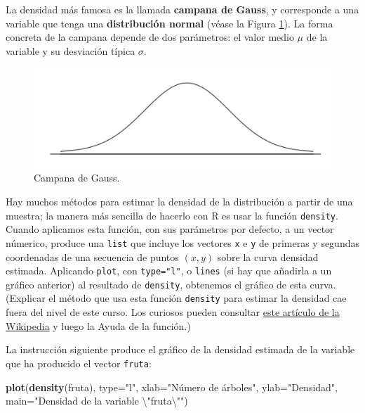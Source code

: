 \documentclass[]{book}
\newenvironment{Shaded}{\begin{snugshade}}{\end{snugshade}}
\newcommand{\CharTok}[1]{\textcolor[rgb]{0.31,0.60,0.02}{#1}}
\newcommand{\DataTypeTok}[1]{\textcolor[rgb]{0.13,0.29,0.53}{#1}}
\newcommand{\KeywordTok}[1]{\textcolor[rgb]{0.13,0.29,0.53}{\textbf{#1}}}
\newcommand{\NormalTok}[1]{#1}
\newcommand{\StringTok}[1]{\textcolor[rgb]{0.31,0.60,0.02}{#1}}
\theoremstyle{definition}
\theoremstyle{definition}
\theoremstyle{definition}
\theoremstyle{remark}
\begin{document}
La densidad más famosa es la llamada \textbf{campana de Gauss}, y corresponde a una variable que tenga una \textbf{distribución normal} (véase la Figura \ref{fig:norm}). La forma concreta de la campana depende de dos parámetros: el valor medio \(\mu\) de la variable y su desviación típica \(\sigma\).

\begin{figure}

{\centering \includegraphics[width=1\linewidth]{AprendeR-Parte-I_files/figure-html/gauss} 

}

\caption{Campana de Gauss.}\label{fig:norm}
\end{figure}

Hay muchos métodos para estimar la densidad de la distribución a partir de una muestra; la manera más sencilla de hacerlo con R es usar la función \texttt{density}. Cuando aplicamos esta función, con sus parámetros por defecto, a un vector númerico, produce una \texttt{list} que incluye los vectores \texttt{x} e \texttt{y} de primeras y segundas coordenadas de una secuencia de puntos \((x,y)\) sobre la curva densidad estimada. Aplicando \texttt{plot}, con \texttt{type="l"}, o \texttt{lines} (si hay que añadirla a un gráfico anterior) al resultado de \texttt{density}, obtenemos el gráfico de esta curva. (Explicar el método que usa esta función \texttt{density} para estimar la densidad cae fuera del nivel de este curso. Los curiosos pueden consultar \href{http://en.wikipedia.org/wiki/Kernel_density_estimation}{este artículo de la Wikipedia} y luego la Ayuda de la función.)

La instrucción siguiente produce el gráfico de la densidad estimada de la variable que ha producido el vector \texttt{fruta}:

\begin{Shaded}
\begin{Highlighting}[]
\KeywordTok{plot}\NormalTok{(}\KeywordTok{density}\NormalTok{(fruta), }\DataTypeTok{type=}\StringTok{"l"}\NormalTok{, }\DataTypeTok{xlab=}\StringTok{"Número de árboles"}\NormalTok{,}
  \DataTypeTok{ylab=}\StringTok{"Densidad"}\NormalTok{, }\DataTypeTok{main=}\StringTok{"Densidad de la variable }\CharTok{\textbackslash{}"}\StringTok{fruta}\CharTok{\textbackslash{}"}\StringTok{"}\NormalTok{)}
\end{Highlighting}
\end{Shaded}
\end{document}
